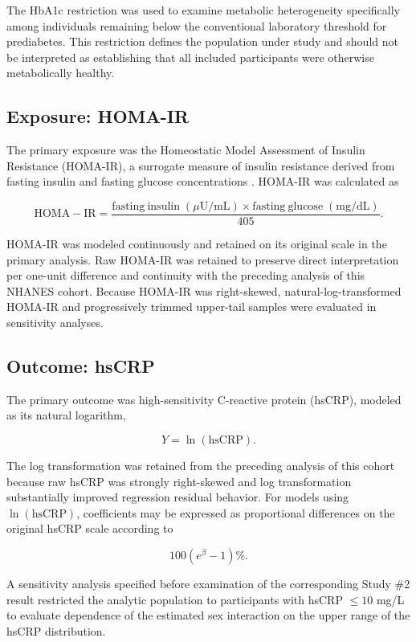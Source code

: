 \documentclass[11pt]{article}
\begin{document}
The HbA1c restriction was used to examine metabolic heterogeneity specifically
among individuals remaining below the conventional laboratory threshold for
prediabetes. This restriction defines the population under study and should
not be interpreted as establishing that all included participants were
otherwise metabolically healthy.

\subsection{Exposure: HOMA-IR}

The primary exposure was the Homeostatic Model Assessment of Insulin
Resistance (HOMA-IR), a surrogate measure of insulin resistance derived from
fasting insulin and fasting glucose concentrations
\citep{Matthews1985HOMA,Wallace2004HOMA}. HOMA-IR was calculated as

\[
\mathrm{HOMA\!-\!IR}
=
\frac{
\mathrm{fasting\ insulin}\;(\mu\mathrm{U/mL})
\times
\mathrm{fasting\ glucose}\;(\mathrm{mg/dL})
}{405}.
\]

HOMA-IR was modeled continuously and retained on its original scale in the
primary analysis. Raw HOMA-IR was retained to preserve direct interpretation
per one-unit difference and continuity with the preceding analysis of this
NHANES cohort. Because HOMA-IR was right-skewed, natural-log-transformed
HOMA-IR and progressively trimmed upper-tail samples were evaluated in
sensitivity analyses.

\subsection{Outcome: hsCRP}

The primary outcome was high-sensitivity C-reactive protein (hsCRP), modeled
as its natural logarithm,

\[
Y=\ln(\mathrm{hsCRP}).
\]

The log transformation was retained from the preceding analysis of this
cohort because raw hsCRP was strongly right-skewed and log transformation
substantially improved regression residual behavior. For models using
$\ln(\mathrm{hsCRP})$, coefficients may be expressed as proportional
differences on the original hsCRP scale according to

\[
100\left(e^\beta-1\right)\%.
\]

A sensitivity analysis specified before examination of the corresponding
Study \#2 result restricted the analytic population to participants with
hsCRP $\leq10$ mg/L to evaluate dependence of the estimated
sex interaction on the upper range of the hsCRP distribution.
\end{document}

